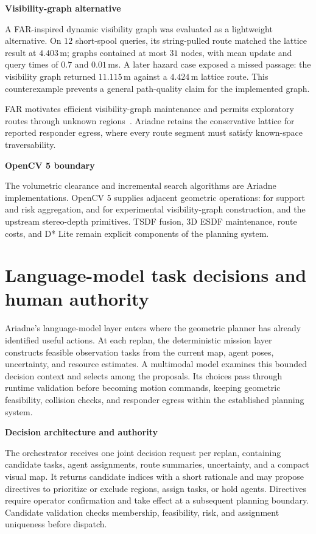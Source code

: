 \documentclass[10pt,a4paper]{article}
\newcommand{\code}[1]{\texttt{\small\detokenize{#1}}}
\newcommand{\indentedheading}[1]{\par\addvspace{0.65em}\noindent\hspace*{1em}\textbf{#1}\par\smallskip}
\begin{document}
\indentedheading{Visibility-graph alternative}

A FAR-inspired dynamic visibility graph was evaluated as a
lightweight alternative. On $12$ short-spool queries, its
string-pulled route matched the lattice result at $4.403$\,m;
graphs contained at most $31$ nodes, with mean update and query
times of $0.7$ and $0.01$\,ms. A later hazard case exposed a
missed passage: the visibility graph returned $11.115$\,m against
a $4.424$\,m lattice route. This counterexample prevents a
general path-quality claim for the implemented graph.

FAR motivates efficient visibility-graph maintenance and permits
exploratory routes through unknown regions~\cite{far2022}.
Ariadne retains the conservative lattice for reported responder
egress, where every route segment must satisfy known-space
traversability.

\indentedheading{OpenCV 5 boundary}

The volumetric clearance and incremental search algorithms are
Ariadne implementations. OpenCV 5 supplies adjacent geometric
operations: \code{cv::filter2D} for support and risk aggregation,
\code{cv::findContours} and \code{cv::approxPolyDP} for experimental
visibility-graph construction, and the upstream stereo-depth
primitives. TSDF fusion, 3D ESDF maintenance, route costs, and
D* Lite remain explicit components of the planning system.



\section{Language-model task decisions and human authority}

Ariadne's language-model layer enters where the geometric planner has
already identified useful actions. At each replan, the deterministic
mission layer constructs feasible observation tasks from the current
map, agent poses, uncertainty, and resource estimates. A multimodal
model examines this bounded decision context and selects among the
proposals. Its choices pass through runtime validation before becoming
motion commands, keeping geometric feasibility, collision checks,
and responder egress within the established planning system.

\indentedheading{Decision architecture and authority}

The orchestrator receives one joint decision request per replan,
containing candidate tasks, agent assignments, route summaries,
uncertainty, and a compact visual map. It returns candidate indices
with a short rationale and may propose directives to prioritize or
exclude regions, assign tasks, or hold agents. Directives require
operator confirmation and take effect at a subsequent planning
boundary. Candidate validation checks membership, feasibility,
risk, and assignment uniqueness before dispatch.
\end{document}
